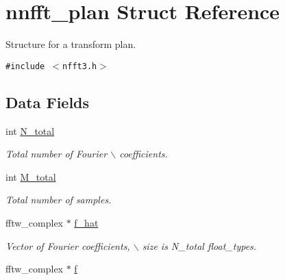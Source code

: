 \hypertarget{structnnfft__plan}{
\section{nnfft\_\-plan Struct Reference}
\label{structnnfft__plan}
}
Structure for a transform plan.  


{\tt \#include $<$nfft3.h$>$}

\subsection*{Data Fields}
\begin{CompactItemize}
\item 
\hypertarget{structnnfft__plan_2ea309e4dfb994f4a9fe86d1440cafa2}{
int \hyperlink{structnnfft__plan_2ea309e4dfb994f4a9fe86d1440cafa2}{N\_\-total}}
\label{structnnfft__plan_2ea309e4dfb994f4a9fe86d1440cafa2}

\begin{CompactList}\small\item\em Total number of Fourier $\backslash$ coefficients. \item\end{CompactList}\item 
\hypertarget{structnnfft__plan_5e60b36fd90e44a68a72f129a2b4be6c}{
int \hyperlink{structnnfft__plan_5e60b36fd90e44a68a72f129a2b4be6c}{M\_\-total}}
\label{structnnfft__plan_5e60b36fd90e44a68a72f129a2b4be6c}

\begin{CompactList}\small\item\em Total number of samples. \item\end{CompactList}\item 
\hypertarget{structnnfft__plan_b13f0f93fe991a5831ff78312f9b9e4b}{
fftw\_\-complex $\ast$ \hyperlink{structnnfft__plan_b13f0f93fe991a5831ff78312f9b9e4b}{f\_\-hat}}
\label{structnnfft__plan_b13f0f93fe991a5831ff78312f9b9e4b}

\begin{CompactList}\small\item\em Vector of Fourier coefficients, $\backslash$ size is N\_\-total float\_\-types. \item\end{CompactList}\item 
\hypertarget{structnnfft__plan_773de7440f04f7d3e23419cd94caa2eb}{
fftw\_\-complex $\ast$ \hyperlink{structnnfft__plan_773de7440f04f7d3e23419cd94caa2eb}{f}}
\label{structnnfft__plan_773de7440f04f7d3e23419cd94caa2eb}


\end{CompactItemize}
